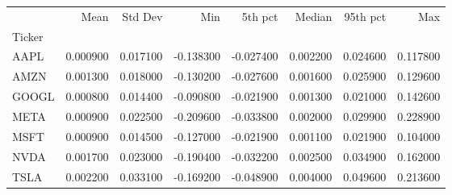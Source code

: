 \begin{tabular}{lrrrrrrr}
\toprule
 & Mean & Std Dev & Min & 5th pct & Median & 95th pct & Max \\
Ticker &  &  &  &  &  &  &  \\
\midrule
AAPL & 0.000900 & 0.017100 & -0.138300 & -0.027400 & 0.002200 & 0.024600 & 0.117800 \\
AMZN & 0.001300 & 0.018000 & -0.130200 & -0.027600 & 0.001600 & 0.025900 & 0.129600 \\
GOOGL & 0.000800 & 0.014400 & -0.090800 & -0.021900 & 0.001300 & 0.021000 & 0.142600 \\
META & 0.000900 & 0.022500 & -0.209600 & -0.033800 & 0.002000 & 0.029900 & 0.228900 \\
MSFT & 0.000900 & 0.014500 & -0.127000 & -0.021900 & 0.001100 & 0.021900 & 0.104000 \\
NVDA & 0.001700 & 0.023000 & -0.190400 & -0.032200 & 0.002500 & 0.034900 & 0.162000 \\
TSLA & 0.002200 & 0.033100 & -0.169200 & -0.048900 & 0.004000 & 0.049600 & 0.213600 \\
\bottomrule
\end{tabular}
